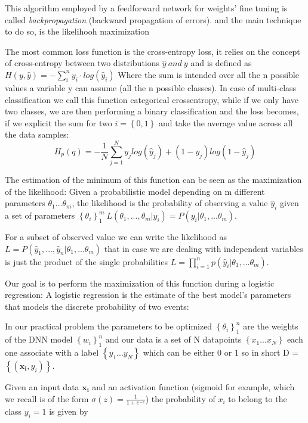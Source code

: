 \documentclass[a4paper,11pt]{article}
\begin{document}
This algorithm employed by a feedforward network for weights' fine tuning is called \emph{backpropagation} (backward propagation of errors).
and the main technique to do so, is the likelihooh maximization

The most common loss function is the cross-entropy loss, it relies on the concept of cross-entropy between two distributions $\hat y \ and \ y$ and is defined as
$H(y, \hat y) = -\sum_i^n y_i \cdot log(\hat y_i)$
Where the sum is intended over all the n possible values a variable y can assume (all the n possible classes).
In case of multi-class classification we call this function categorical crossentropy, while if we only have two classes, we are then performing a binary classification and the loss becomes, if we explicit the sum for two $i = \left\{0, 1\right\}$ and take the average value across all the data samples:
\begin{equation}
H_p(q) = -\frac{1}{N} \sum_{j= 1}^N y_j log(\hat y_j) + (1-y_j)log(1-\hat y_j)
\end{equation}

The estimation of the minimum of this function can be seen as the maximization of the likelihood:
Given a probabilistic model depending on m different parameters $\theta_1 ... \theta_m$, the likelihood is the probability of observing a value $\hat y_i$ given a set of parameters $\left\{\theta_i \right\}_1 ^m \ L(\theta_1, ..., \theta_m | y_i) = P(y_i|\theta_1, ...\theta_m)$.

For a subset of observed value we can write the likelihood as $L = P(\hat y_1, ..., \hat y_n | \theta_1, ...\theta_m)$ that in case we are dealing with independent variables is just the product of the single probabilities $L =\prod_{i=1}^n p(\hat y_i|\theta_1, ...\theta_m)$.


Our goal is to perform the maximization of this function during a logistic regression:
A logistic regression is the estimate of the best model's parameters that models the discrete probability of two events:

In our practical problem the parameters to be optimized $\left\{\theta_i \right\}_1^n$ are the weights of the DNN model $\left\{w_i \right\}_1^n$ and our data is a set of N datapoints $\left\{ x_1 ... x_N\right\}$ each one associate with a label  $\left\{ y_1 ... y_N\right\}$ which can be either 0 or 1 so in short D = $\left\{ (\mathbf{x_i}, y_i)\right\}$.

Given an input data $\mathbf{x_i}$  and an activation function (sigmoid for example, which we recall is of the form $\sigma(z) = \frac{1}{1+e^{-z}}$) the probability of $x_i$ to belong to the class $y_i = 1$ is given by
\end{document}
